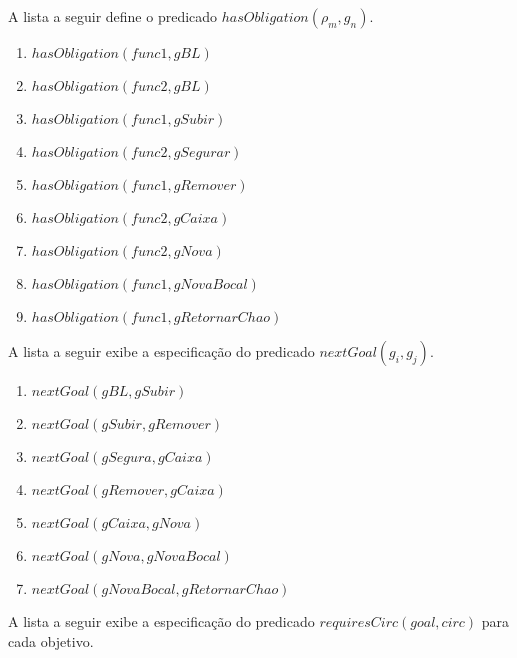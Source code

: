 A lista a seguir define o predicado $hasObligation(\rho_m,g_n)$. 

\begin{enumerate}
	\item $hasObligation(func1,gBL)$
	\item $hasObligation(func2,gBL)$
	\item $hasObligation(func1,gSubir)$
	\item $hasObligation(func2,gSegurar)$
	\item $hasObligation(func1,gRemover)$
	\item $hasObligation(func2,gCaixa)$
	\item $hasObligation(func2,gNova)$
	\item $hasObligation(func1,gNovaBocal)$
	\item $hasObligation(func1,gRetornarChao)$
\end{enumerate}

A lista a seguir exibe a especificação do predicado $nextGoal(g_i,g_j)$. 

\begin{enumerate}
	\item $nextGoal(gBL,gSubir)$
	\item $nextGoal(gSubir,gRemover)$
	\item $nextGoal(gSegura,gCaixa)$ 
	\item $nextGoal(gRemover,gCaixa)$
	\item $nextGoal(gCaixa,gNova)$
	\item $nextGoal(gNova,gNovaBocal)$
	\item $nextGoal(gNovaBocal,gRetornarChao)$
\end{enumerate}

A lista a seguir exibe a especificação do predicado $requiresCirc(goal,circ)$ para cada objetivo.

